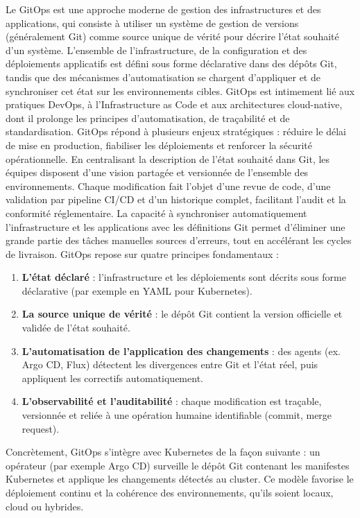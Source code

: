 Le GitOps est une approche moderne de gestion des infrastructures et des applications, qui consiste à utiliser un système de gestion de versions (généralement Git) comme source unique de vérité pour décrire l’état souhaité d’un système. L’ensemble de l’infrastructure, de la configuration et des déploiements applicatifs est défini sous forme déclarative dans des dépôts Git, tandis que des mécanismes d’automatisation se chargent d’appliquer et de synchroniser cet état sur les environnements cibles. GitOps est intimement lié aux pratiques DevOps, à l’Infrastructure as Code et aux architectures cloud-native, dont il prolonge les principes d’automatisation, de traçabilité et de standardisation.
GitOps répond à plusieurs enjeux stratégiques : réduire le délai de mise en production, fiabiliser les déploiements et renforcer la sécurité opérationnelle. En centralisant la description de l’état souhaité dans Git, les équipes disposent d’une vision partagée et versionnée de l’ensemble des environnements. Chaque modification fait l’objet d’une revue de code, d’une validation par pipeline CI/CD et d’un historique complet, facilitant l’audit et la conformité réglementaire. La capacité à synchroniser automatiquement l’infrastructure et les applications avec les définitions Git permet d’éliminer une grande partie des tâches manuelles sources d’erreurs, tout en accélérant les cycles de livraison.
GitOps repose sur quatre principes fondamentaux :
\begin{enumerate}
	\item \textbf{L’état déclaré} : l’infrastructure et les déploiements sont décrits sous forme déclarative (par exemple en YAML pour Kubernetes).
	\item \textbf{La source unique de vérité} : le dépôt Git contient la version officielle et validée de l’état souhaité.
	\item \textbf{L’automatisation de l’application des changements} : des agents (ex. Argo CD, Flux) détectent les divergences entre Git et l’état réel, puis appliquent les correctifs automatiquement.
	\item \textbf{L’observabilité et l’auditabilité} : chaque modification est traçable, versionnée et reliée à une opération humaine identifiable (commit, merge request).
\end{enumerate}

Concrètement, GitOps s’intègre avec Kubernetes de la façon suivante : un opérateur (par exemple Argo CD) surveille le dépôt Git contenant les manifestes Kubernetes et applique les changements détectés au cluster. Ce modèle favorise le déploiement continu et la cohérence des environnements, qu’ils soient locaux, cloud ou hybrides.

